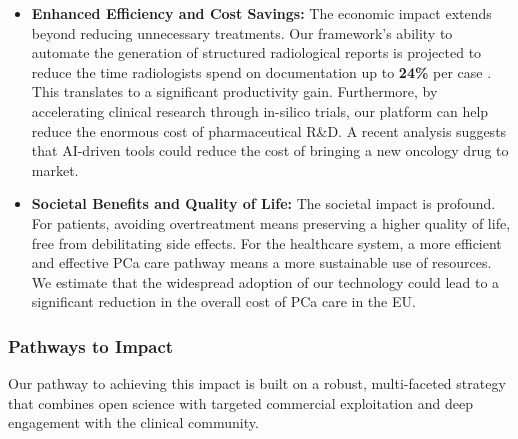 \documentclass[11pt, a4paper]{article}
\begin{document}
\begin{itemize}
    \item \textbf{Enhanced Efficiency and Cost Savings:} The economic impact extends beyond reducing unnecessary treatments. Our framework's ability to automate the generation of structured radiological reports is projected to reduce the time radiologists spend on documentation up to \textbf{24\%} per case \cite{Acosta_2024}. This translates to a significant productivity gain. Furthermore, by accelerating clinical research through in-silico trials, our platform can help reduce the enormous cost of pharmaceutical R\&D. A recent analysis suggests that AI-driven tools could reduce the cost of bringing a new oncology drug to market.

    \item \textbf{Societal Benefits and Quality of Life:} The societal impact is profound. For patients, avoiding overtreatment means preserving a higher quality of life, free from debilitating side effects. For the healthcare system, a more efficient and effective PCa care pathway means a more sustainable use of resources. We estimate that the widespread adoption of our technology could lead to a significant reduction in the overall cost of PCa care in the EU.

    
\end{itemize}

\subsubsection{Pathways to Impact}

Our pathway to achieving this impact is built on a robust, multi-faceted strategy that combines open science with targeted commercial exploitation and deep engagement with the clinical community.
\end{document}
